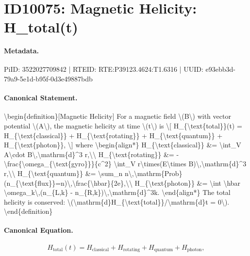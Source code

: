 \section*{ID10075: Magnetic Helicity: H\_total(t)}
\paragraph{Metadata.}
PiID: 3522027709842 | RTEID: RTE:P39123.4624:T1.6316 | UUID: e93ebb3d-79a9-5e1d-b95f-0d3e49887bdb

\paragraph{Canonical Statement.}
\textbackslash{}begin\{definition\}[Magnetic Helicity] For a magnetic field \textbackslash{}(B\textbackslash{}) with vector potential \textbackslash{}(A\textbackslash{}), the magnetic helicity at time \textbackslash{}(t\textbackslash{}) is \textbackslash{}[ H\_\{\textbackslash{}text\{total\}\}(t) = H\_\{\textbackslash{}text\{classical\}\} + H\_\{\textbackslash{}text\{rotating\}\} + H\_\{\textbackslash{}text\{quantum\}\} + H\_\{\textbackslash{}text\{photon\}\}, \textbackslash{}] where \textbackslash{}begin\{align*\} H\_\{\textbackslash{}text\{classical\}\} \&= \textbackslash{}int\_V A\textbackslash{}cdot B\textbackslash{},\textbackslash{}mathrm\{d\}\textasciicircum{}3 r,\textbackslash{}\textbackslash{} H\_\{\textbackslash{}text\{rotating\}\} \&= -\textbackslash{}frac\{\textbackslash{}omega\_\{\textbackslash{}text\{gyro\}\}\}\{c\textasciicircum{}2\} \textbackslash{}int\_V r\textbackslash{}times(E\textbackslash{}times B)\textbackslash{},\textbackslash{}mathrm\{d\}\textasciicircum{}3 r,\textbackslash{}\textbackslash{} H\_\{\textbackslash{}text\{quantum\}\} \&= \textbackslash{}sum\_n n\textbackslash{},\textbackslash{}mathrm\{Prob\}(n\_\{\textbackslash{}text\{flux\}\}=n)\textbackslash{},\textbackslash{}frac\{\textbackslash{}hbar\}\{2e\},\textbackslash{}\textbackslash{} H\_\{\textbackslash{}text\{photon\}\} \&= \textbackslash{}int \textbackslash{}hbar \textbackslash{}omega\_k\textbackslash{},(n\_\{L,k\} - n\_\{R,k\})\textbackslash{},\textbackslash{}mathrm\{d\}\textasciicircum{}3k. \textbackslash{}end\{align*\} The total helicity is conserved: \textbackslash{}(\textbackslash{}mathrm\{d\}H\_\{\textbackslash{}text\{total\}\}/\textbackslash{}mathrm\{d\}t = 0\textbackslash{}). \textbackslash{}end\{definition\}

\paragraph{Canonical Equation.}
\[
H_{\text{total}}(t) = H_{\text{classical}} + H_{\text{rotating}} + H_{\text{quantum}} + H_{\text{photon}},
\]

